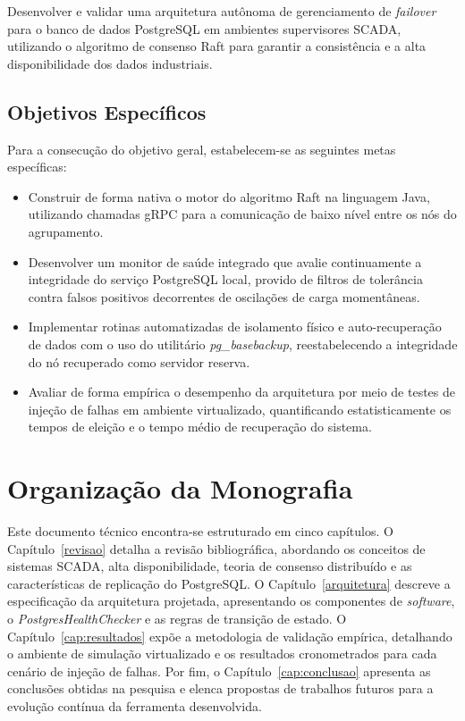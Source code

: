 Desenvolver e validar uma arquitetura autônoma de gerenciamento de \textit{failover} para o banco de dados PostgreSQL em ambientes supervisores SCADA, utilizando o algoritmo de consenso Raft para garantir a consistência e a alta disponibilidade dos dados industriais.

\subsection{Objetivos Específicos}

Para a consecução do objetivo geral, estabelecem-se as seguintes metas específicas:

\begin{itemize}
    \item Construir de forma nativa o motor do algoritmo Raft na linguagem Java, utilizando chamadas gRPC para a comunicação de baixo nível entre os nós do agrupamento.
    \item Desenvolver um monitor de saúde integrado que avalie continuamente a integridade do serviço PostgreSQL local, provido de filtros de tolerância contra falsos positivos decorrentes de oscilações de carga momentâneas.
    \item Implementar rotinas automatizadas de isolamento físico e auto-recuperação de dados com o uso do utilitário \textit{pg\_basebackup}, reestabelecendo a integridade do nó recuperado como servidor reserva.
    \item Avaliar de forma empírica o desempenho da arquitetura por meio de testes de injeção de falhas em ambiente virtualizado, quantificando estatisticamente os tempos de eleição e o tempo médio de recuperação do sistema.
\end{itemize}

\section{Organização da Monografia}

Este documento técnico encontra-se estruturado em cinco capítulos. O Capítulo~\ref{revisao} detalha a revisão bibliográfica, abordando os conceitos de sistemas SCADA, alta disponibilidade, teoria de consenso distribuído e as características de replicação do PostgreSQL. O Capítulo~\ref{arquitetura} descreve a especificação da arquitetura projetada, apresentando os componentes de \textit{software}, o \textit{PostgresHealthChecker} e as regras de transição de estado. O Capítulo~\ref{cap:resultados} expõe a metodologia de validação empírica, detalhando o ambiente de simulação virtualizado e os resultados cronometrados para cada cenário de injeção de falhas. Por fim, o Capítulo~\ref{cap:conclusao} apresenta as conclusões obtidas na pesquisa e elenca propostas de trabalhos futuros para a evolução contínua da ferramenta desenvolvida.